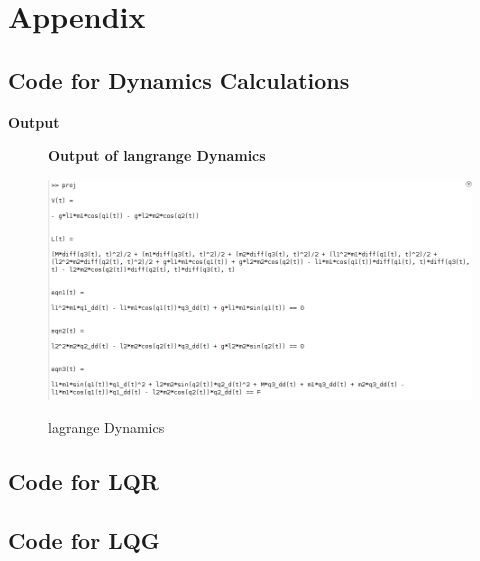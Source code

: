 \documentclass[12pt]{article}
\begin{document}
\section{Appendix}
\subsection{Code for Dynamics Calculations}
%

\textbf{Output}
\begin{figure}[H]
    \centering
    \textbf{Output of langrange Dynamics}\par\medskip
    \includegraphics[scale = 0.5]{lagrange.png}\\[0.0 cm]	%
    \caption{lagrange Dynamics} 
\end{figure}

\subsection{Code for LQR}
%

\subsection{Code for LQG}
\end{document}
